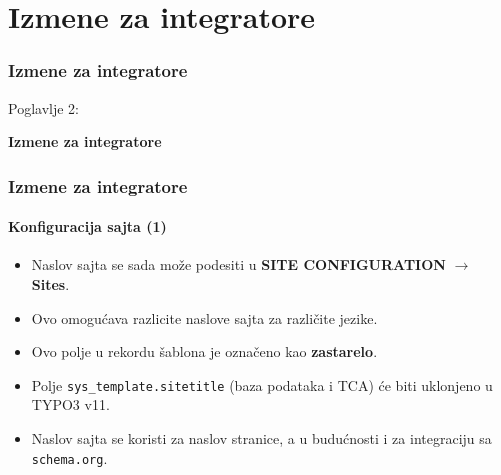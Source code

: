 %

\section{Izmene za integratore}
\begin{frame}[fragile]
	\frametitle{Izmene za integratore}

	\begin{center}\huge{Poglavlje 2:}\end{center}
	\begin{center}\huge{\color{typo3darkgrey}\textbf{Izmene za integratore}}\end{center}

\end{frame}


\begin{frame}[fragile]
	\frametitle{Izmene za integratore}
	\framesubtitle{Konfiguracija sajta (1)}

	\begin{itemize}

		\item Naslov sajta se sada može podesiti u
			\textbf{SITE CONFIGURATION} $\rightarrow$ \textbf{Sites}.
		\item Ovo omogućava razlicite naslove sajta za različite jezike.
		\item Ovo polje u rekordu šablona je označeno kao \textbf{zastarelo}.
		\item Polje \texttt{sys\_template.sitetitle} (baza podataka i TCA) će biti uklonjeno u TYPO3 v11.
		\item Naslov sajta se koristi za naslov stranice, a u budućnosti i za integraciju sa
		  \texttt{schema.org}.
	\end{itemize}

\end{frame}


